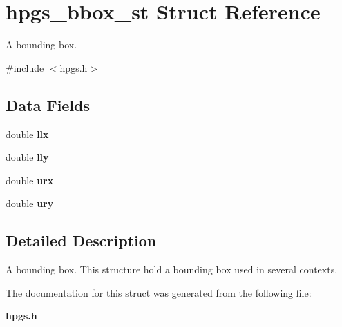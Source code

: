 \section{hpgs\_\-bbox\_\-st Struct Reference}
\label{structhpgs__bbox__st}


A bounding box.  




{\ttfamily \#include $<$hpgs.h$>$}

\subsection*{Data Fields}
\begin{DoxyCompactItemize}
\item 
double {\bfseries llx}\label{structhpgs__bbox__st_aaff8aadd54c02b116b041c4517eefee6}

\item 
double {\bfseries lly}\label{structhpgs__bbox__st_afd888b275dbed90bda74c001d45893bb}

\item 
double {\bfseries urx}\label{structhpgs__bbox__st_a0ed6074f88e1de231a078ce0396cc517}

\item 
double {\bfseries ury}\label{structhpgs__bbox__st_a128adb72fc1967d1c5c55c18b4cb6a02}

\end{DoxyCompactItemize}


\subsection{Detailed Description}
A bounding box. This structure hold a bounding box used in several contexts. 

The documentation for this struct was generated from the following file:\begin{DoxyCompactItemize}
\item 
{\bf hpgs.h}\end{DoxyCompactItemize}
